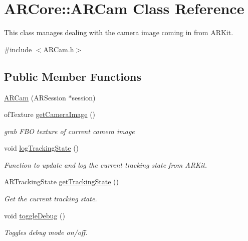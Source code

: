 \hypertarget{class_a_r_core_1_1_a_r_cam}{}\section{A\+R\+Core\+:\+:A\+R\+Cam Class Reference}
\label{class_a_r_core_1_1_a_r_cam}


This class manages dealing with the camera image coming in from A\+R\+Kit.  




{\ttfamily \#include $<$A\+R\+Cam.\+h$>$}

\subsection*{Public Member Functions}
\begin{DoxyCompactItemize}
\item 
\mbox{\hyperlink{class_a_r_core_1_1_a_r_cam_aac3da0758960b1cc5787eae0b7efffe1}{A\+R\+Cam}} (A\+R\+Session $\ast$session)
\item 
of\+Texture \mbox{\hyperlink{class_a_r_core_1_1_a_r_cam_a7e0e81c2a201955219364f5e3f1b1915}{get\+Camera\+Image}} ()
\begin{DoxyCompactList}\small\item\em grab F\+BO texture of current camera image \end{DoxyCompactList}\item 
void \mbox{\hyperlink{class_a_r_core_1_1_a_r_cam_aea3513907e5805e6bffb08b7d65c0fc7}{log\+Tracking\+State}} ()
\begin{DoxyCompactList}\small\item\em Function to update and log the current tracking state from A\+R\+Kit. \end{DoxyCompactList}\item 
A\+R\+Tracking\+State \mbox{\hyperlink{class_a_r_core_1_1_a_r_cam_abef41c0e5914cb2404b26317921d16a1}{get\+Tracking\+State}} ()
\begin{DoxyCompactList}\small\item\em Get the current tracking state. \end{DoxyCompactList}\item 
void \mbox{\hyperlink{class_a_r_core_1_1_a_r_cam_ad32236d8551ac38943f088f16afb8002}{toggle\+Debug}} ()
\begin{DoxyCompactList}\small\item\em Toggles debug mode on/off. \end{DoxyCompactList}\item 

\end{DoxyCompactItemize}
